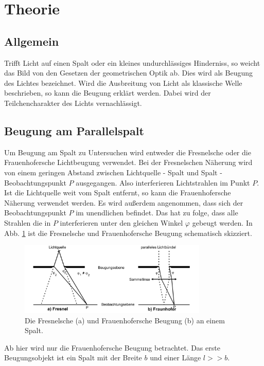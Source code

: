 \section{Theorie}
\label{sec:Theorie}

\subsection{Allgemein}
Trifft Licht auf einen Spalt oder ein kleines undurchlässiges Hinderniss, so weicht das Bild von den Gesetzen der geometrischen Optik ab.
Dies wird als Beugung des Lichtes bezeichnet.
Wird die Ausbreitung von Licht als klassische Welle beschrieben, so kann die Beugung erklärt werden.
Dabei wird der Teilchencharakter des Lichts vernachlässigt.

\subsection{Beugung am Parallelspalt}
Um Beugung am Spalt zu Untersuchen wird entweder die Fresnelsche oder die Frauenhofersche Lichtbeugung verwendet.
Bei der Fresnelschen Näherung wird von einem geringen Abstand zwischen Lichtquelle - Spalt und Spalt - Beobachtungspunkt $P$ ausgegangen.
Also interferieren Lichtstrahlen im Punkt $P$.
\\
Ist die Lichtquelle weit vom Spalt entfernt, so kann die Frauenhofersche Näherung verwendet werden.
Es wird außerdem angenommen, dass sich der Beobachtungspunkt $P$ im unendlichen befindet.
Das hat zu folge, dass alle Strahlen die in $P$ interferieren unter den gleichen Winkel $\varphi$ gebeugt werden.
In Abb. \ref{fig:naeherung} ist die Fresnelsche und Frauenhofersche Beugung schematisch skizziert.
\begin{figure}
    \centering
    \includegraphics[width=0.8\textwidth]{content/data/naeherung.jpg}
    \caption{Die Fresnelsche (a) und Frauenhofersche Beugung (b) an einem Spalt. \cite[2]{anleitung}}
    \label{fig:naeherung}
\end{figure}
Ab hier wird nur die Frauenhofersche Beugung betrachtet.
Das erste Beugungsobjekt ist ein Spalt mit der Breite $b$ und einer Länge $l >> b$.
